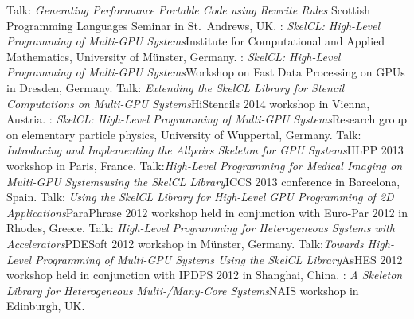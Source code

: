          {Talk: \emph{Generating Performance Portable Code using Rewrite Rules}\newline
         \small Scottish Programming Languages Seminar in St.\ Andrews, UK.}
         {: \emph{SkelCL\@: High-Level Programming of Multi-GPU
          Systems}\newline \small Institute for Computational and Applied
          Mathematics, University of Münster, Germany.}
         {: \emph{SkelCL\@: High-Level Programming of Multi-GPU
          Systems}\newline \small Workshop on Fast Data Processing on GPUs in
          Dresden, Germany.}
         {Talk: \emph{Extending the SkelCL Library for Stencil
          Computations on Multi-GPU Systems}\newline \small HiStencils 2014
          workshop in Vienna, Austria.}
         {: \emph{SkelCL\@: High-Level Programming of Multi-GPU
          Systems}\newline \small Research group on elementary particle physics,
          University of Wuppertal, Germany.}
         {Talk: \emph{Introducing and Implementing the Allpairs Skeleton for GPU
          Systems}\newline \small HLPP 2013 workshop in Paris, France.}
         {Talk:\emph{High-Level Programming for Medical Imaging on Multi-GPU
          Systems\newline using the SkelCL Library}\newline \small ICCS 2013 conference in
          Barcelona, Spain.}
       {Talk: \emph{Using the SkelCL Library for High-Level GPU Programming of
        2D Applications}\newline \small ParaPhrase 2012 workshop held in
        conjunction with Euro-Par 2012 in Rhodes, Greece.}
       {Talk: \emph{High-Level Programming for Heterogeneous Systems with
        Accelerators}\newline \small PDESoft 2012 workshop in Münster, Germany.}
       {Talk:\emph{Towards High-Level Programming of Multi-GPU Systems Using
        the SkelCL Library}\newline \small AsHES 2012 workshop held in
        conjunction with IPDPS 2012 in Shanghai, China.}
       {: \emph{A Skeleton Library for Heterogeneous
        Multi-/Many-Core Systems}\newline \small NAIS workshop in Edinburgh, UK.}
